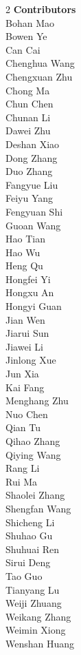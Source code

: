 \begin{multicols}{2}
\noindent
\textbf{Contributors} \\
\noindent
Bohan Mao \\
Bowen Ye \\
Can Cai \\
Chenghua Wang \\
Chengxuan Zhu   \\
Chong Ma \\
Chun Chen   \\
Chunan Li   \\
Dawei Zhu \\
Deshan Xiao \\
Dong Zhang \\
Duo Zhang \\
Fangyue Liu \\
Feiyu Yang   \\
Fengyuan Shi   \\
Guoan Wang \\
Hao Tian \\
Hao Wu \\
Heng Qu \\
Hongfei Yi \\
Hongxu An \\
Hongyi Guan \\
Jian Wen   \\
Jiarui Sun \\
Jiawei Li \\
Jinlong Xue   \\
Jun Xia \\
Kai Fang \\
Menghang Zhu \\
Nuo Chen \\
Qian Tu \\
Qihao Zhang \\
Qiying Wang   \\
Rang Li   \\
Rui Ma \\
Shaolei Zhang \\
Shengfan Wang   \\
Shicheng Li \\
Shuhao Gu \\
Shuhuai Ren \\
Sirui Deng \\
Tao Guo \\
Tianyang Lu \\
Weiji Zhuang \\
Weikang Zhang   \\
Weimin Xiong   \\
Wenshan Huang   \\

\end{multicols}
